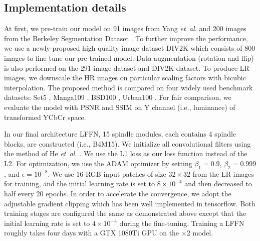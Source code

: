 \documentclass[journal]{IEEEtran}
\begin{document}
\subsection{Implementation details}
At first, we pre-train our model on 91 images from Yang \emph{et~al.} \cite{yang2010image} and 200 images from the Berkeley Segmentation Dataset \cite{arbelaez2011contour}. To further improve the performance, we use a newly-proposed high-quality image dataset DIV2K \cite{agustsson2017ntire} which consists of 800 images to fine-tune our pre-trained model. Data augmentation (rotation and flip) is also performed on the 291-image dataset and DIV2K dataset. To produce LR images, we downscale the HR images on particular scaling factors with bicubic interpolation. The proposed method is compared on four widely used benchmark datasets: Set5 \cite{bevilacqua2012low}, Manga109 \cite{matsui2017sketch}, BSD100 \cite{martin2001database}, Urban100 \cite{huang2015single}. For fair comparison, we evaluate the model with PSNR and SSIM on Y channel (i.e., luminance) of transformed YCbCr space.
\par In our final architecture LFFN, 15 spindle modules, each contains 4 spindle blocks, are constructed (i.e., B4M15). We initialize all convolutional filters using the method of He \emph{et~al.} \cite{he2015delving}. We use the L1 loss as our loss function instead of the L2.  For optimization, we use the ADAM optimizer \cite{kingma2014adam} by setting $\beta_{1}=0.9$, $\beta_{2}=0.999$, and $\epsilon=10^{-8}$. We use 16 RGB input patches of size $32\times32$ from the LR images for training, and the initial learning rate is set to $8\times10^{-4}$ and then decreased to half every 20 epochs. In order to accelerate the convergence, we adopt the adjustable gradient clipping \cite{Kim2016Accurate} which has been well implemented in tensorflow. Both training stages are configured the same as demonstrated above except that the initial learning rate is set to $4\times10^{-4}$ during the fine-tuning. Training a LFFN roughly takes four days with a GTX 1080Ti GPU on the $\times$2 model.
\end{document}
